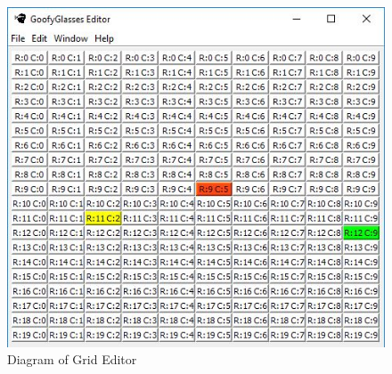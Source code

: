 \documentclass[12pt]{article}
\begin{document}
			\begin{figure}[ht!]
				\centering
				\includegraphics[width=120mm]{protoGrid.JPG}
				\caption{Diagram of Grid Editor \label{overflow}}
			\end{figure}
		
			
		
		\clearpage
		
		
\end{document}
